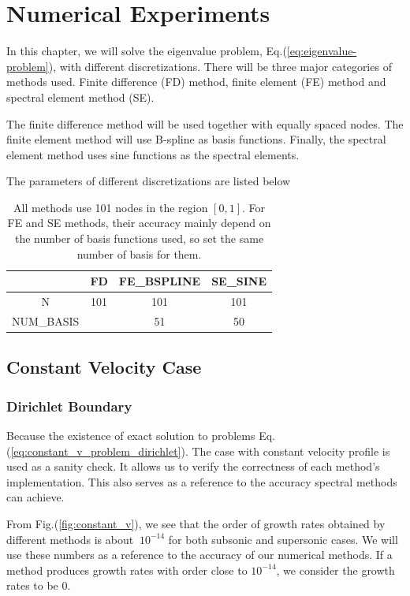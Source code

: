 \chapter{Numerical Experiments}
In this chapter, we will solve the eigenvalue problem, Eq.(\ref{eq:eigenvalue-problem}), with different discretizations. There will be three major categories of methods used. Finite difference (FD) method, finite element (FE) method and spectral element method (SE).

The finite difference method will be used together with equally spaced nodes. The finite element method will use B-spline as basis functions. Finally, the spectral element method uses sine functions as the spectral elements.

The parameters of different discretizations are listed below
\begin{table} [H]
	\centering
	\caption{All methods use 101 nodes in the region $[0,1]$. For FE and SE methods, their accuracy mainly depend on the number of basis functions used, so set the same number of basis for them.}
	\begin{tabular}{|c|c|c|c|}
		\hline
		& FD & FE\_BSPLINE & SE\_SINE  \\
		\hline
		N & 101 & 101 & 101 \\
		\hline
		NUM\_BASIS &  & 51 & 50 \\
		\hline
	\end{tabular}
	\label{table:parameters}
\end{table}

\section{Constant Velocity Case}
\subsection{Dirichlet Boundary}
Because the existence of exact solution to problems Eq.(\ref{eq:constant_v_problem_dirichlet}). The case with constant velocity profile is used as a sanity check. It allows us to verify the correctness of each method's implementation. This also serves as a reference to the accuracy spectral methods can achieve.

From Fig.(\ref{fig:constant_v}), we see that the order of growth rates obtained by different methods is about $~10^{-14}$ for both subsonic and supersonic cases. We will use these numbers as a reference to the accuracy of our numerical methods. If a method produces growth rates with order close to $10^{-14}$, we consider the growth rates to be 0.

